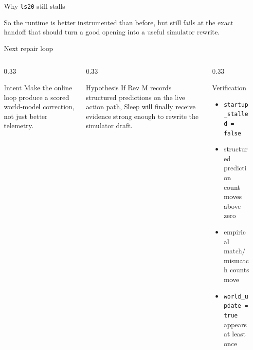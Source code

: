 \documentclass[aspectratio=169]{beamer}
\begin{document}
\begin{frame}{Why \texttt{ls20} still stalls}
\centering
{}

\vspace{0.45em}
\small
So the runtime is better instrumented than before, but still fails at the exact handoff that should turn a good opening into a useful simulator rewrite.
\end{frame}

\begin{frame}{Next repair loop}
\small
\begin{columns}[T,totalwidth=\textwidth]
\begin{column}{0.33\textwidth}
\begin{block}{Intent}
Make the online loop produce a scored world-model correction, not just better telemetry.
\end{block}
\end{column}
\begin{column}{0.33\textwidth}
\begin{block}{Hypothesis}
If Rev M records structured predictions on the live action path, Sleep will finally receive evidence strong enough to rewrite the simulator draft.
\end{block}
\end{column}
\begin{column}{0.33\textwidth}
\begin{block}{Verification}
\begin{itemize}
\item \texttt{startup\_stalled = false}
\item structured prediction count moves above zero
\item empirical match/mismatch counts move
\item \texttt{world\_update = true} appears at least once
\end{itemize}
\end{block}
\end{column}
\end{columns}
\end{frame}
\end{document}
